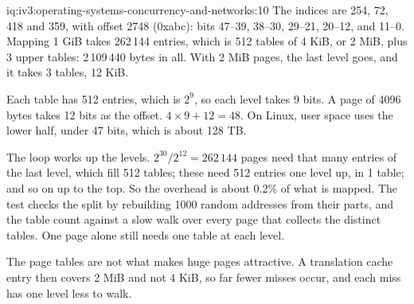 \begin{solution}{iq:iv3:operating-systems-concurrency-and-networks:10}
The indices are 254, 72, 418 and 359, with offset 2748 (0xabc): bits 47--39, 38--30, 29--21, 20--12, and 11--0. Mapping 1 GiB takes 262\,144 entries, which is 512 tables of 4 KiB, or 2 MiB, plus 3 upper tables: 2\,109\,440 bytes in all. With 2 MiB pages, the last level goes, and it takes 3 tables, 12 KiB.
\label{lst:iv3:os:pagewalk}

Each table has 512 entries, which is $2^9$, so each level takes 9 bits. A page of 4096 bytes takes 12 bits as the offset. $4 \times 9 + 12 = 48$. On Linux, user space uses the lower half, under 47 bits, which is about 128 TB.

The loop works up the levels. $2^{30} / 2^{12} = 262\,144$ pages need that many entries of the last level, which fill 512 tables; these need 512 entries one level up, in 1 table; and so on up to the top. So the overhead is about 0.2\% of what is mapped. The test checks the split by rebuilding 1000 random addresses from their parts, and the table count against a slow walk over every page that collects the distinct tables. One page alone still needs one table at each level.

The page tables are not what makes huge pages attractive. A translation cache entry then covers 2 MiB and not 4 KiB, so far fewer misses occur, and each miss has one level less to walk.

\end{solution}

